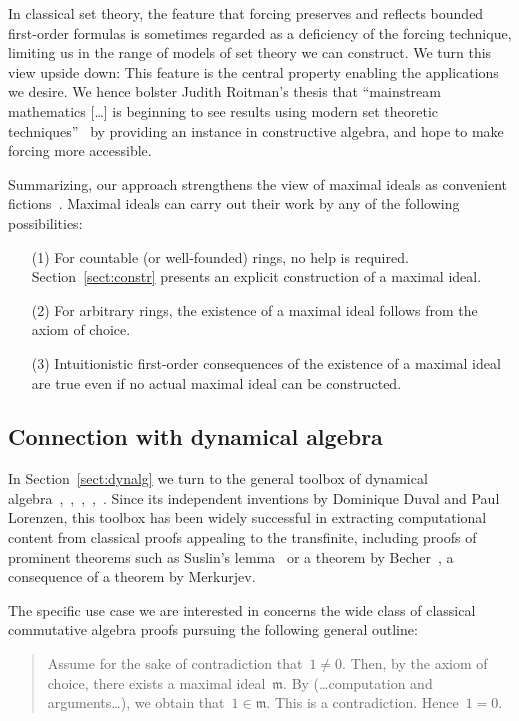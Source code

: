 \documentclass[com,11pt,crcready]{iosart2x}
\theoremstyle{definition}
\theoremstyle{plain}
\theoremstyle{remark}
\newcommand{\?}{\,{:}\,}
\newcommand{\mmm}{\mathfrak{m}}
\renewcommand{\_}{\mathpunct{.}\,}
\begin{document}
In classical set theory, the feature that forcing preserves and reflects
bounded first-order formulas is sometimes regarded as a deficiency of the
forcing technique, limiting us in the range of models of set theory we can
construct. We turn this view upside down: This feature is the central property
enabling the applications we desire. We hence bolster Judith Roitman's thesis
that ``mainstream mathematics [\ldots\!] is beginning to see results using modern
set theoretic techniques''~\cite{roitman:uses} by providing an instance in
constructive algebra, and hope to make forcing more accessible.

Summarizing, our approach strengthens the view of maximal ideals as convenient
fictions~\cite[Section~1]{schuster-wessel:krull}. Maximal ideals can carry out
their work by any of the following possibilities:
\begin{enumerate}
\item[(1)] For countable (or well-founded) rings, no help is required.
Section~\ref{sect:constr} presents an explicit construction of a maximal ideal.
\item[(2)] For arbitrary rings, the existence of a maximal ideal follows from the
axiom of choice.
\item[(3)] Intuitionistic first-order consequences of the existence of a maximal
ideal are true even if no actual maximal ideal can be constructed.
\end{enumerate}


\subsection*{Connection with dynamical algebra}

In Section~\ref{sect:dynalg} we turn to the general toolbox of dynamical
algebra~\cite[Section~XV.6]{lombardi-quitte:constructive-algebra},~\cite{coquand-lombardi-roy:dynamicalmethod},~\cite{yengui:constructive},~\cite{duval:about},~\cite{neuwirth:lorenzen}. Since its
independent inventions by Dominique Duval and Paul
Lorenzen, this toolbox has been widely
successful in extracting computational content from classical proofs
appealing to the transfinite, including proofs of prominent theorems such as
Suslin's lemma~\cite{suslin:structure,yengui:maximal} or a theorem by
Becher~\cite{becher:csa}, a consequence of a theorem by Merkurjev.

The specific use case we are interested in concerns the wide class of classical
commutative algebra proofs pursuing the following general outline:
\begin{quote}\small Assume for the sake of contradiction that~$1 \neq 0$. Then, by the
axiom of choice, there exists a maximal ideal~$\mmm$. By (\ldots computation
and arguments\ldots\!), we obtain that~$1 \in \mmm$. This is a contradiction.
Hence~$1 = 0$.\end{quote}
\end{document}

